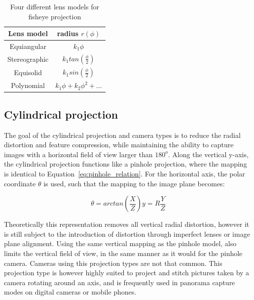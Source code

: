 \begin{table}[!htb]
    \centering
    \begin{tabular}{|c|c|} \hline
        Lens model & radius $r(\phi)$ \\ \hline
        Equiangular & $k_1\phi$\\ \hline
        Stereographic & $k_1 tan\left(\frac{\phi}{2}\right)$\\ \hline
        Equisolid & $k_1 sin\left(\frac{\phi}{2}\right)$\\ \hline 
        Polynomial & $k_1 \phi + k_2 \phi^2 + ...$\\ \hline
    \end{tabular}
    \caption{Four different lens models for fisheye projection}
    \label{tab:theory_fisheye_lens_model}
\end{table}

\subsection{Cylindrical projection}

The goal of the cylindrical projection and camera types is to reduce the radial distortion and feature compression, while maintaining the ability to capture images with a horizontal field of view larger than $180^o$. Along the vertical y-axis, the cylindrical projection functions like a pinhole projection, where the mapping is identical to Equation~\eqref{eq:pinhole_relation}. For the horizontal axis, the polar coordinate $\theta$ is used, such that the mapping to the image plane becomes:

\begin{subequations}
\begin{equation}
    \theta = arctan\left(\frac{X}{Z}\right)
    \label{eq:cylindrical_theta}
\end{equation}
\begin{equation}
    y = R\frac{Y}{Z}
    \label{eq:cylindrical_y}
\end{equation}
\label{eq:cylindrical}
\end{subequations}

Theoretically this representation removes all vertical radial distortion, however it is still subject to the introduction of distortion through imperfect lenses or image plane alignment. Using the same vertical mapping as the pinhole model, also limits the vertical field of view, in the same manner as it would for the pinhole camera. Cameras using this projection types are not that common. This projection type is however highly suited to project and stitch pictures taken by a camera rotating around an axis, and is frequently used in panorama capture modes on digital cameras or mobile phones.

